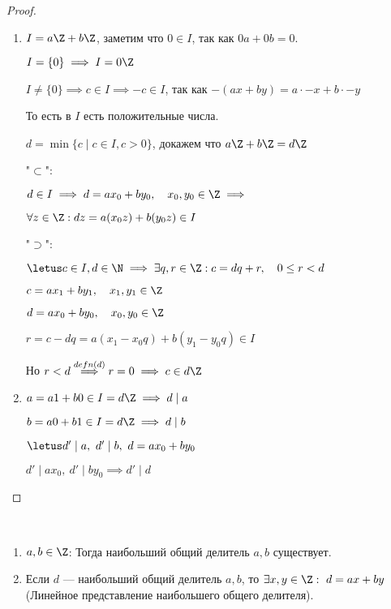 \begin{proof}~
    \begin{enumerate}
        \item $I = a\Z + b\Z$, заметим что $0 \in I$, так как $0a + 0b = 0$.
        
        $I = \{0\} \implies I = 0\Z$
        
        $I \neq \{0\} \implies c \in I \implies -c \in I$, так как $-(ax + by) = a \cdot -x + b \cdot -y$
        
        То есть в $I$ есть положительные числа.
        
        $d = \min\{ c \mid c \in I, c > 0 \}$, докажем что $a\Z + b\Z = d\Z$
        
        "$\subset$":
        
        $d \in I \implies d = ax_0 + by_0, \quad x_0, y_0 \in \Z \implies$
        
        $\forall z \in \Z: dz = a(x_0z) + b(y_0z) \in I$
        
        "$\supset$":
        
        $\letus c \in I, d \in \N \implies \exists q, r \in \Z: c = dq + r, \quad 0 \leq r < d$
        
        $c = ax_1 + by_1, \quad x_1, y_1 \in \Z$
        
        $d = ax_0 + by_0, \quad x_0, y_0 \in \Z$
        
        $r = c - dq = a(x_1 -x_0q) + b(y_1 - y_0q) \in I$
        
        Но $r < d \overset{defn(d)}{\implies} r = 0 \implies c \in d\Z$
        
        \item $a = a1 + b0 \in I = d\Z \implies d \mid a$
        
        $b = a0 + b1 \in I = d\Z \implies d \mid b$
        
        $\letus d' \mid a,~d' \mid b,~d=ax_0 + by_0$
        
        $d' \mid ax_0,~d' \mid by_0 \implies d' \mid d$
    \end{enumerate}
\end{proof}

\begin{follow}~
    \begin{enumerate}
        \item $a, b \in \Z$: Тогда наибольший общий делитель $a, b$ существует.
        
        \item Если $d$ --- наибольший общий делитель $a, b$, то $\exists x, y \in \Z:~d = ax + by$ \quad (Линейное представление наибольшего общего делителя).
    \end{enumerate}
\end{follow}

